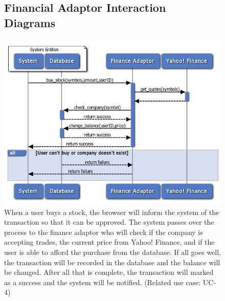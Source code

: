 \begin{figure}[!h]
\subsection{Financial Adaptor Interaction Diagrams}
\centering
\includegraphics[width=5.5in]{./Diagrams/InteractionDiagrams/buyingstock.png}
\caption{When a user buys a stock, the browser will inform the system of the transaction so that it can be approved. The system passes over the process to the finance adaptor who will check if the company is accepting trades, the current price from Yahoo! Finance, and if the user is able to afford the purchase from the database. If all goes well, the transaction will be recorded in the database and the balance will be changed. After all that is complete, the transaction will marked as a success and the system will be notified. (Related use case: UC-4)}
\end{figure}

